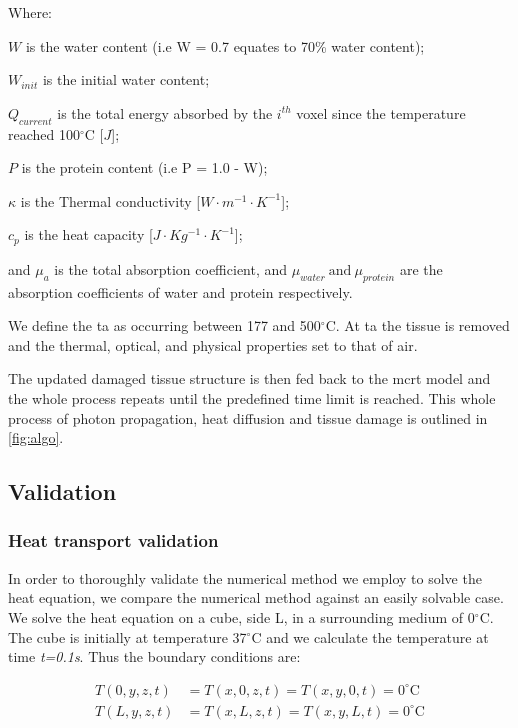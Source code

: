 \noindent Where:

\indent $W$ is the water content (i.e W = 0.7 equates to 70\% water content);

\indent $W_{init}$ is the initial water content;

\indent $Q_{current}$ is the total energy absorbed by the $i^{th}$ voxel since the temperature reached 100$^{\circ}$C [$J$];

\indent $P$ is the protein content (i.e P = 1.0 - W);

\indent $\kappa$ is the Thermal conductivity [$W\cdot m^{-1}\cdot K^{-1}$];

\indent $c_p$ is the heat capacity [$J\cdot Kg^{-1}\cdot K^{-1}$];

\indent and $\mu_a$ is the total absorption coefficient, and $\mu_{water}\ \text{and}\ \mu_{protein}$ are the absorption coefficients of water and protein respectively.

\medskip

We define the \gls{ta} as occurring between 177 and 500$^{\circ}$C\cite{gerstmann1994char,mckenzie1986three}. At \gls{ta} the tissue is removed and the thermal, optical, and physical properties set to that of air.

The updated damaged tissue structure is then fed back to the \gls{mcrt} model and the whole process repeats until the predefined time limit is reached. This whole process of photon propagation, heat diffusion and tissue damage is outlined in \cref{fig:algo}.

\subsection{Validation}

\subsubsection{Heat transport validation}

In order to thoroughly validate the numerical method we employ to solve the heat equation, we compare the numerical method against an easily solvable case. We solve the heat equation on a cube, side L, in a surrounding medium of 0$^{\circ}$C. The cube is initially at temperature 37$^{\circ}$C and we calculate the temperature at time \textit{t=0.1s}. Thus the boundary conditions are:

\begin{align}
T(0,y,z,t)&=T(x,0,z,t)=T(x,y,0,t)=0^{\circ}\text{C} \label{eqn:bc1}\\
T(L,y,z,t)&=T(x,L,z,t)=T(x,y,L,t)=0^{\circ}\text{C} \label{eqn:bc2}\\
\end{align}

